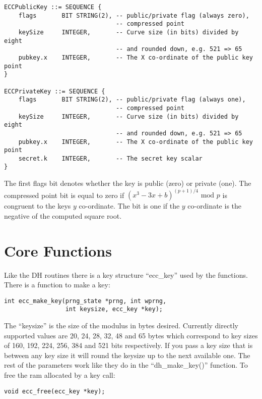 \documentclass[a4paper]{book}
\begin{document}
\begin{small}
\begin{verbatim}
ECCPublicKey ::= SEQUENCE {
    flags       BIT STRING(2), -- public/private flag (always zero), 
                               -- compressed point
    keySize     INTEGER,       -- Curve size (in bits) divided by eight 
                               -- and rounded down, e.g. 521 => 65
    pubkey.x    INTEGER,       -- The X co-ordinate of the public key point
}

ECCPrivateKey ::= SEQUENCE {
    flags       BIT STRING(2), -- public/private flag (always one), 
                               -- compressed point
    keySize     INTEGER,       -- Curve size (in bits) divided by eight 
                               -- and rounded down, e.g. 521 => 65
    pubkey.x    INTEGER,       -- The X co-ordinate of the public key point
    secret.k    INTEGER,       -- The secret key scalar
}
\end{verbatim}
\end{small}

The first flags bit denotes whether the key is public (zero) or private (one).  The compressed point bit is equal to zero if $(x^3 - 3x + b)^{(p+1)/4} \mbox{ mod }p$ is 
congruent to the keys $y$ co-ordinate.  The bit is one if the $y$ co-ordinate is the negative of the computed square root.

\section{Core Functions}

Like the DH routines there is a key structure ``ecc\_key'' used by the functions.  There is a function to make a key:
\begin{verbatim}
int ecc_make_key(prng_state *prng, int wprng, 
                 int keysize, ecc_key *key);
\end{verbatim}

The ``keysize'' is the size of the modulus in bytes desired.  Currently directly supported values are 20, 24, 28, 32, 48 and 65 bytes which
correspond to key sizes of 160, 192, 224, 256, 384 and 521 bits respectively.  If you pass a key size that is between any key size
it will round the keysize up to the next available one.  The rest of the parameters work like they do in the ``dh\_make\_key()'' function.  
To free the ram allocated by a key call:
\begin{verbatim}
void ecc_free(ecc_key *key);
\end{verbatim}
\end{document}
